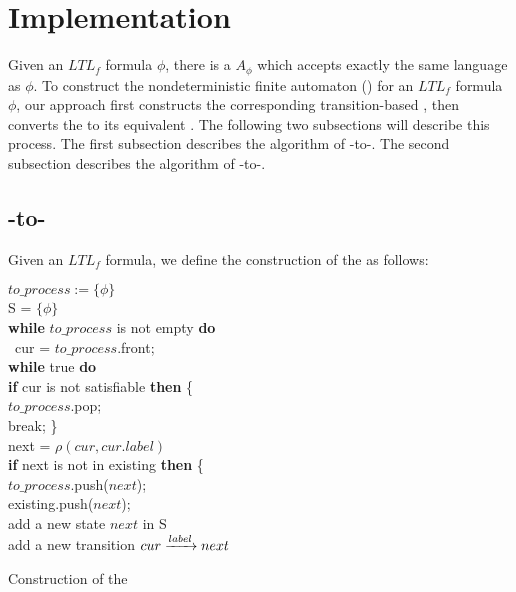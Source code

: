 \section{Implementation}\label{sec:algorithm}
Given an $LTL_f$ formula $\phi$, there is a \NFA $A_{\phi}$ which accepts exactly the same language as $\phi$. To construct the nondeterministic finite automaton (\NFA) for an $ LTL_f$ formula $\phi$, our approach first constructs the corresponding transition-based \NFA, then converts the \TNFA to its equivalent \NFA. The following two subsections will describe this process. The first subsection describes the algorithm of \ltlf-to-\TNFA. The second subsection describes the algorithm of \TNFA-to-\NFA.

\subsection{\ltlf-to-\TNFA}
Given an  $ LTL_f$ formula, we define the construction of the \TNFA  as follows: \\
  \begin{algorithm}[H]
    \SetAlgoNoLine
    \BlankLine
 $to\_process:= \{\phi\}$\\
 S = $\{\phi\}$ \\
\textbf{while} $to\_process$ is not empty \textbf{do} \\
\ cur =  $to\_process$.front;  \\
\quad  \textbf{while} true \textbf{do} \\
\qquad   \textbf{if} cur is not satisfiable  \textbf{then} \{ \\
\qquad \quad $to\_process$.pop; \\
\qquad \quad break;     \}\\
 \qquad  next = $\rho(cur, cur.label)$ \\
\qquad\textbf{if} next is not in existing \textbf{then} \{ \\
\qquad \quad $to\_process$.push($next$); \\
\qquad \quad existing.push($next$); \\
\qquad  \quad add a new state $next$ in S\\
\qquad  add a new transition $cur\xrightarrow[]{label}next$
 \caption{Construction of the \TNFA}
\end{algorithm}

